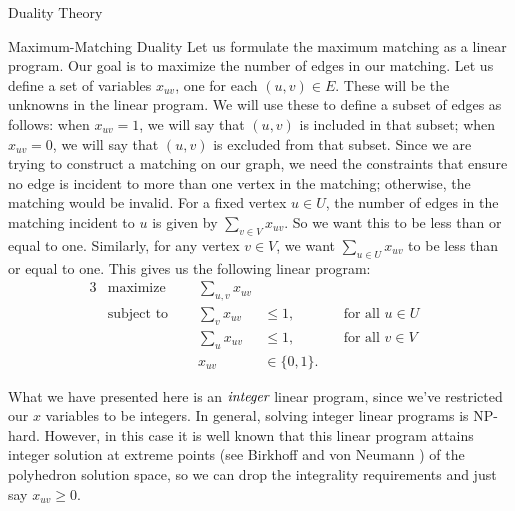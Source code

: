 \begin{section}{Duality Theory}
\begin{subsection}{Maximum-Matching Duality}
	Let us formulate the maximum matching as a linear program. Our goal is to maximize the number 
	of edges in our matching. Let us define a set of variables $x_{uv}$, one for each $(u,v)\in E$. 
	These will be the unknowns in the linear program. We will use these to define a subset of 
	edges as follows: when $x_{uv} = 1$, we will say that $(u,v)$ is included in that subset; 
	when $x_{uv} = 0$, we will say that $(u,v)$ is excluded from that subset. Since we are trying 
	to construct a matching on our graph, we need the constraints that ensure no edge is incident to 
	more than one vertex in the matching; otherwise, the matching would be invalid. For a fixed 
	vertex $u\in U$, the number of edges in the matching incident 
	to $u$ is given by $\sum_{v\in V} x_{uv}$. So we want this to be less than or equal to one. 
	Similarly, for any vertex $v\in V$, we want $\sum_{u\in U} x_{uv}$ to be less than or equal to 
	one. This gives us the following linear program:
	\begin{alignat}{3}
		& \text{maximize } & \sum_{u,v} x_{uv}& \\
		& \text{subject to } \quad & \sum_{v} x_{uv} & \leq 1, & \quad \text{for all } u\in U& \\
				     &\quad & \sum_{u} x_{uv} & \leq 1, & \quad \text{for all } v\in 
				     V & \\
				&& x_{uv} & \in \{0,1\}.
	\end{alignat}

	What we have presented here is an $\emph{integer}$ linear program, since we've restricted our 
	$x$ variables to be integers. In general, solving integer linear programs is NP-hard. However, 
	in this case it is well known that this linear program attains integer solution at extreme points
	(see Birkhoff \cite{birkhoff1946} and von Neumann \cite{vN53})
	of the polyhedron solution space, so we can drop the integrality requirements and just say 
	$x_{uv} \geq 0$.


\end{subsection}
\end{section}

